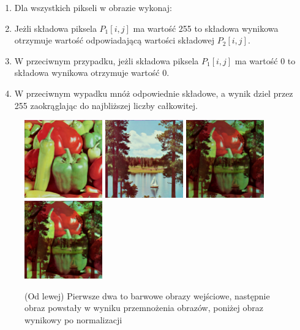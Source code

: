 \documentclass[final,a4paper,openany,12pt]{mwbk}
\begin{document}
	\begin{enumerate}
		\item Dla wszystkich pikseli w obrazie wykonaj:
		\item Jeżli składowa piksela $P_{1}[i,j]$ ma wartość 255 to składowa wynikowa otrzymuje wartość odpowiadającą wartości składowej $P_{2}[i,j]$.
		\item W przeciwnym przypadku, jeżli składowa piksela $P_{1}[i,j]$ ma wartość 0 to składowa wynikowa otrzymuje wartość 0.
		\item W przeciwnym wypadku mnóż odpowiednie składowe, a wynik dziel przez 255 zaokrąglając do najbliższej liczby całkowitej.
	\end{enumerate}

\begin{figure}[H]
	\begin{center}
		\includegraphics[width=0.3\textwidth]{1/1Color_Multipl_Img1_Original}
		\includegraphics[width=0.3\textwidth]{1/1Color_Multipl_Img2_Original}
		\includegraphics[width=0.3\textwidth]{1/1Color_Multipl_Img_Result}
		\includegraphics[width=0.3\textwidth]{1/1Color_Multipl_Img_Result_Norm}
	\end{center}
	\caption{(Od lewej) Pierwsze dwa to barwowe obrazy wejściowe, następnie obraz powstały w wyniku przemnożenia obrazów, poniżej obraz wynikowy po normalizacji }
\end{figure}
\end{document}
